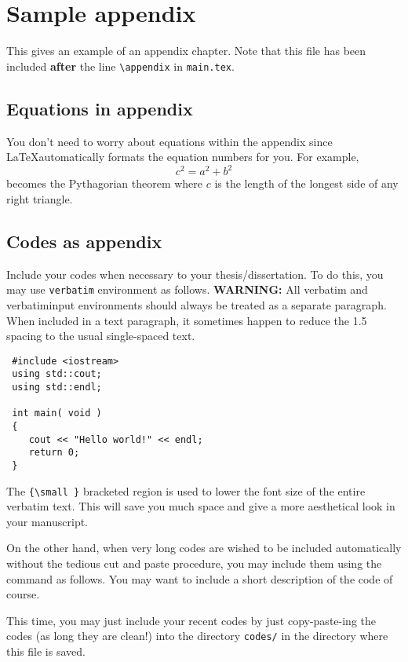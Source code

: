 \chapter{Sample appendix}

This gives an example of an appendix chapter.  Note that this file
has been included \textbf{after} the line \verb+\appendix+ in
\verb+main.tex+.

\section{Equations in appendix}

\hspace{\parindent} You don't need to worry about equations within
the appendix since \LaTeX automatically formats the equation
numbers for you. For example,
\begin{equation}\label{eq:appendixEqn}
    c^2 = a^2 + b^2
\end{equation}
becomes the Pythagorian theorem where $c$ is the length of the
longest side of any right triangle.

\section{Codes as appendix}

\hspace{\parindent}Include your codes when necessary to your
thesis/dissertation. To do this, you may use \verb+verbatim+
environment as follows. \textbf{WARNING:} All verbatim and
verbatiminput environments should always be treated as a separate
paragraph.  When included in a text paragraph, it sometimes happen
to reduce the 1.5 spacing to the usual single-spaced text.

{\small
\begin{verbatim}
 #include <iostream>
 using std::cout;
 using std::endl;

 int main( void )
 {
    cout << "Hello world!" << endl;
    return 0;
 }
\end{verbatim}
}

The \verb+{\small }+ bracketed region is used to lower the font
size of the entire verbatim text.  This will save you much space
and give a more aesthetical look in your manuscript.

On the other hand, when very long codes are wished to be included
automatically without the tedious cut and paste procedure, you may
include them using the \verb++ command as follows.
You may want to include a short description of the code of course.

{\small
 
}

This time, you may just include your recent codes by just
copy-paste-ing the codes (as long they are clean!) into the
directory \verb$codes/$ in the directory where this file is saved.
